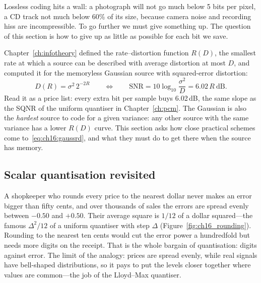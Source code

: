 Lossless coding hits a wall: a photograph will not go much below 5 bits per pixel, a CD track not
much below 60\% of its size, because camera noise and recording hiss are incompressible. To go
further we must give something up. The question of this section is how to give up as little as
possible for each bit we save.

Chapter~\ref{ch:infotheory} defined the rate--distortion function $R(D)$, the smallest rate at
which a source can be described with average distortion at most $D$, and computed it for the
memoryless Gaussian source with squared-error distortion:
\begin{equation}
D(R)=\sigma^2\,2^{-2R}\qquad\Longleftrightarrow\qquad \mathrm{SNR}=10\log_{10}\frac{\sigma^2}{D}=6.02\,R\ \mathrm{dB}.
\label{eq:ch16:gaussrd}
\end{equation}
Read it as a price list: every extra bit per sample buys 6.02\,dB, the same slope as the SQNR of
the uniform quantiser in Chapter~\ref{ch:pcm}. The Gaussian is also the \emph{hardest} source to
code for a given variance: any other source with the same variance has a lower $R(D)$ curve. This
section asks how close practical schemes come to~\eqref{eq:ch16:gaussrd}, and what they must do to
get there when the source has memory.

\subsection{Scalar quantisation revisited}

\begin{analogy}
A shopkeeper who rounds every price to the nearest dollar never makes an error bigger than fifty
cents, and over thousands of sales the errors are spread evenly between $-0.50$ and $+0.50$. Their
average square is $1/12$ of a dollar squared---the famous $\Delta^2/12$ of a uniform quantiser with
step $\Delta$ (Figure~\ref{fig:ch16_rounding}). Rounding to the nearest ten cents would cut the
error power a hundredfold but needs more digits on the receipt. That is the whole bargain of
quantisation: digits against error. The limit of the analogy: prices are spread evenly, while real
signals have bell-shaped distributions, so it pays to put the levels closer together where values
are common---the job of the Lloyd--Max quantiser.
\end{analogy}



